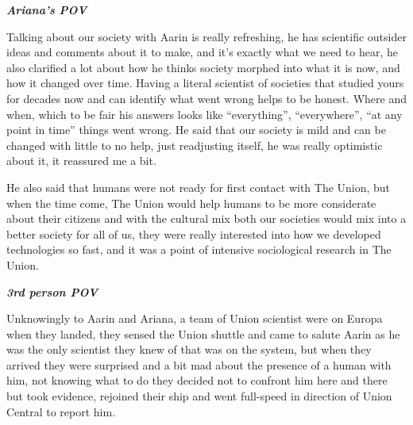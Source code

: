 \documentclass[hidelinks,12pt,a4paper]{book}
\begin{document}
\textit{\textbf{Ariana's POV}}\par
\bigskip

Talking about our society with Aarin is really refreshing, he has scientific outsider ideas and comments about 
it to make, and it's exactly what we need to hear, he also clarified a lot about how he thinks society morphed into
 what it is now, and how it changed over time. Having a literal scientist of societies that studied yours
  for decades now and can identify what went wrong helps to be honest. Where and when, which to be fair his answers looks like “everything”,
  “everywhere”, “at any point in time” things went wrong. He said that our society is mild and can be changed with little to no help,
   just readjusting itself, he was really optimistic about it, it reassured me a bit.\par
   \bigskip

He also said that humans were not ready for first contact with The Union, but when the time come, 
The Union would help humans to be more considerate about their citizens and with the cultural mix both our societies 
would mix into a better society for all of us, they were really interested into how we developed technologies so fast,
 and it was a point of intensive sociological research in The Union.\par
 \bigskip

\textit{\textbf{3rd person POV}}\par
\bigskip

Unknowingly to Aarin and Ariana, a team of Union scientist were on Europa when they landed,
 they sensed the Union shuttle and came to salute Aarin as he was the only scientist they knew of that was on the system, 
 but when they arrived they were surprised and a bit mad about the presence of a human with him, 
 not knowing what to do they decided not to confront him here and there but took evidence, rejoined their ship and 
 went full-speed in direction of Union Central to report him.\par
 \bigskip


\printglossaries
\end{document}
